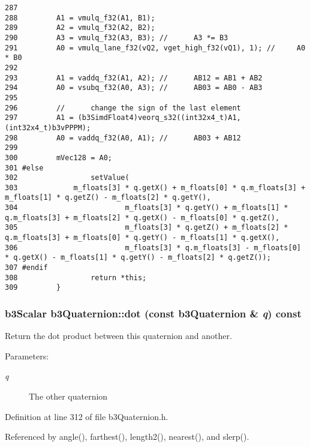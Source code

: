 \begin{Code}
\begin{verbatim}
287 
288         A1 = vmulq_f32(A1, B1);
289         A2 = vmulq_f32(A2, B2);
290         A3 = vmulq_f32(A3, B3); //      A3 *= B3
291         A0 = vmulq_lane_f32(vQ2, vget_high_f32(vQ1), 1); //     A0 * B0
292 
293         A1 = vaddq_f32(A1, A2); //      AB12 = AB1 + AB2
294         A0 = vsubq_f32(A0, A3); //      AB03 = AB0 - AB3 
295         
296         //      change the sign of the last element
297         A1 = (b3SimdFloat4)veorq_s32((int32x4_t)A1, (int32x4_t)b3vPPPM);        
298         A0 = vaddq_f32(A0, A1); //      AB03 + AB12
299         
300         mVec128 = A0;
301 #else
302                 setValue(
303             m_floats[3] * q.getX() + m_floats[0] * q.m_floats[3] + m_floats[1] * q.getZ() - m_floats[2] * q.getY(),
304                         m_floats[3] * q.getY() + m_floats[1] * q.m_floats[3] + m_floats[2] * q.getX() - m_floats[0] * q.getZ(),
305                         m_floats[3] * q.getZ() + m_floats[2] * q.m_floats[3] + m_floats[0] * q.getY() - m_floats[1] * q.getX(),
306                         m_floats[3] * q.m_floats[3] - m_floats[0] * q.getX() - m_floats[1] * q.getY() - m_floats[2] * q.getZ());
307 #endif
308                 return *this;
309         }
\end{verbatim}
\end{Code}


\hypertarget{classb3_quaternion_747537c86fc2d63a6fc43db811952634}{
\subsubsection[dot]{\setlength{\rightskip}{0pt plus 5cm}b3Scalar b3Quaternion::dot (const {\bf b3Quaternion} \& {\em q}) const}}
\label{classb3_quaternion_747537c86fc2d63a6fc43db811952634}


Return the dot product between this quaternion and another. 

\begin{Desc}
\item[Parameters:]
\begin{description}
\item[{\em q}]The other quaternion \end{description}
\end{Desc}


Definition at line 312 of file b3Quaternion.h.

Referenced by angle(), farthest(), length2(), nearest(), and slerp().

